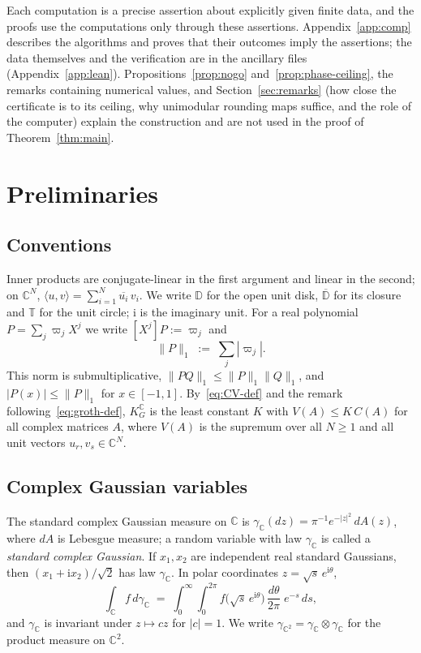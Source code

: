 \documentclass[11pt,reqno]{amsart}
\theoremstyle{definition}
\numberwithin{equation}{section}
\newcommand{\C}{\mathbb{C}}
\newcommand{\D}{\mathbb{D}}
\newcommand{\T}{\mathbb{T}}
\newcommand{\KGC}{K_G^{\C}}
\newcommand{\ii}{\mathrm{i}}
\newcommand{\gC}{\gamma_{\C}}
\newcommand{\gCC}{\gamma_{\C^2}}
\newcommand{\lone}[1]{\|#1\|_1}
\begin{document}
Each computation is a precise assertion about explicitly given finite data, and the proofs use the computations only through these assertions. Appendix~\ref{app:comp} describes the algorithms and proves that their outcomes imply the assertions; the data themselves and the verification are in the ancillary files (Appendix~\ref{app:lean}). Propositions~\ref{prop:nogo} and~\ref{prop:phase-ceiling}, the remarks containing numerical values, and Section~\ref{sec:remarks} (how close the certificate is to its ceiling, why unimodular rounding maps suffice, and the role of the computer) explain the construction and are not used in the proof of Theorem~\ref{thm:main}.

\section{Preliminaries}\label{sec:prelim}

\subsection{Conventions}
Inner products are conjugate-linear in the first argument and linear in the second; on $\C^N$, $\langle u, v \rangle = \sum_{i=1}^N \overline{u_i}\, v_i$. We write $\D$ for the open unit disk, $\overline{\D}$ for its closure and $\T$ for the unit circle; $\ii$ is the imaginary unit. For a real polynomial $P=\sum_j \varpi_j X^j$ we write $[X^j]P:=\varpi_j$ and
\[
  \lone{P} \;:=\; \sum_j |\varpi_j| .
\]
This norm is submultiplicative, $\lone{PQ}\le\lone{P}\lone{Q}$, and $|P(x)|\le\lone{P}$ for $x\in[-1,1]$. By~\eqref{eq:CV-def} and the remark following~\eqref{eq:groth-def}, $\KGC$ is the least constant $K$ with $V(A)\le K\,C(A)$ for all complex matrices $A$, where $V(A)$ is the supremum over all $N\ge1$ and all unit vectors $u_r,v_s\in\C^N$.

\subsection{Complex Gaussian variables}
The standard complex Gaussian measure on $\C$ is $\gC(dz) = \pi^{-1} e^{-|z|^2}\,dA(z)$, where $dA$ is Lebesgue measure; a random variable with law $\gC$ is called a \emph{standard complex Gaussian}. If $x_1,x_2$ are independent real standard Gaussians, then $(x_1+\ii x_2)/\sqrt2$ has law $\gC$. In polar coordinates $z=\sqrt{s}\,e^{\ii\theta}$,
\begin{equation}\label{eq:polar}
  \int_\C f\,d\gC \;=\; \int_0^\infty\!\!\int_0^{2\pi} f\bigl(\sqrt{s}\,e^{\ii\theta}\bigr)\,\frac{d\theta}{2\pi}\;e^{-s}\,ds ,
\end{equation}
and $\gC$ is invariant under $z\mapsto cz$ for $|c|=1$. We write $\gCC=\gC\otimes\gC$ for the product measure on $\C^2$.
\end{document}

